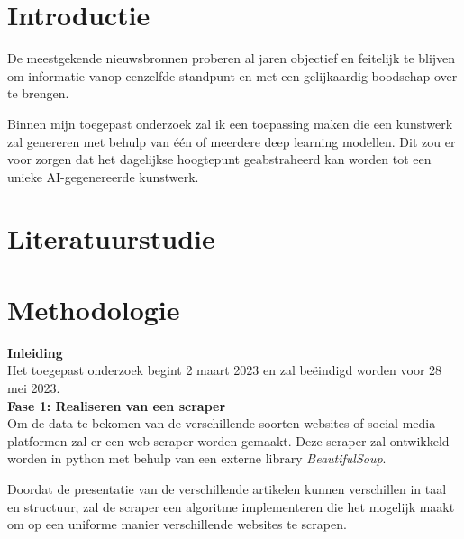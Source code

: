 
\section{Introductie}%
\label{sec:introductie}
\noindent
De meestgekende nieuwsbronnen proberen al jaren objectief en feitelijk te blijven om informatie vanop eenzelfde standpunt en met een gelijkaardig boodschap over te brengen. 

\noindent
Binnen mijn toegepast onderzoek zal ik een toepassing maken die een kunstwerk zal genereren met behulp van één of meerdere deep learning modellen. Dit zou er voor zorgen dat het dagelijkse hoogtepunt geabstraheerd kan worden tot een unieke AI-gegenereerde kunstwerk.



\section{Literatuurstudie}%
\autocite{Salem2020}
\autocite{Lauri2019}



\section{Methodologie}%
\label{sec:methodologie}
\noindent
\textbf{Inleiding} \\
Het toegepast onderzoek begint 2 maart 2023 en zal beëindigd worden voor 28 mei 2023. \\

\noindent
\textbf{Fase 1: Realiseren van een scraper} \\
Om de data te bekomen van de verschillende soorten websites of social-media platformen zal er een web scraper worden gemaakt. Deze scraper zal ontwikkeld worden in python met behulp van een externe library \emph{BeautifulSoup}.

\noindent
Doordat de presentatie van de verschillende artikelen kunnen verschillen in taal en structuur, zal de scraper een algoritme implementeren die het mogelijk maakt om op een uniforme manier verschillende websites te scrapen. \\

